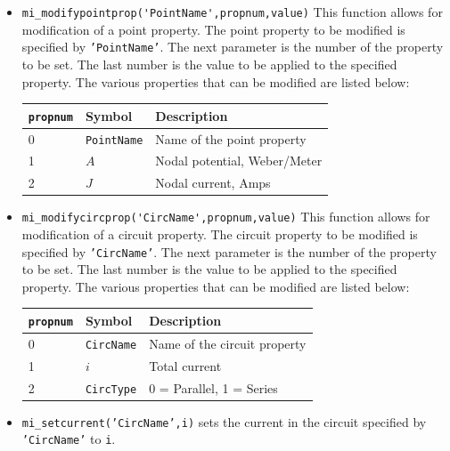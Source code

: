 \begin{itemize}
\begin{center}
\end{center}
\item{\verb+mi_modifypointprop('PointName',propnum,value)+}
This function allows for modification of a point property. The
point property to be modified is specified by {\tt 'PointName'}.
The next parameter is the number of the property to be set. The
last number is the value to be applied to the specified property.
The various properties that can be modified are listed below:
\begin{center}
\begin{tabular}{lll} \hline
{\tt propnum}& Symbol & Description \\ \hline
 0 & {\tt PointName} & Name of the point property \\
 1 & $A$ & Nodal potential, Weber/Meter \\
 2 & $J$ & Nodal current, Amps\\
 \hline
\end{tabular}
\end{center}
\item{\verb+mi_modifycircprop('CircName',propnum,value)+}
This function allows for modification of a circuit property. The
circuit property to be modified is specified by {\tt 'CircName'}.
The next parameter is the number of the property to be set. The
last number is the value to be applied to the specified property.
The various properties that can be modified are listed below:
\begin{center}
\begin{tabular}{lll} \hline
{\tt propnum}& Symbol & Description \\ \hline
 0 & {\tt CircName} & Name of the circuit property \\
 1 & $i$ & Total current \\
 2 & {\tt CircType} & 0 = Parallel, 1 = Series \\ \hline
 \end{tabular}
 \end{center}
\item{\tt mi\_setcurrent('CircName',i)} sets the current in the
circuit specified by {\tt 'CircName'} to {\tt i}.
\end{itemize}

